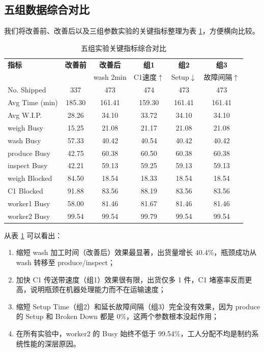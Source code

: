 \documentclass[12pt, a4paper, UTF8]{ctexart}
\begin{document}
\subsection{五组数据综合对比}
我们将改善前、改善后以及三组参数实验的关键指标整理为表 \ref{tab:full_comparison}，方便横向比较。

\begin{table}[H]
    \centering
    \caption{五组实验关键指标综合对比}
    \label{tab:full_comparison}
    \small
    \begin{tabular}{lccccc}
        \toprule
        \textbf{指标} & \textbf{改善前} & \textbf{改善后} & \textbf{组1} & \textbf{组2} & \textbf{组3} \\
        & & wash 2min & C1速度$\uparrow$ & Setup$\downarrow$ & 故障间隔$\uparrow$ \\
        \midrule
        No. Shipped & 337 & 473 & 474 & 473 & 473 \\
        Avg Time (min) & 185.30 & 161.41 & 159.30 & 161.41 & 161.41 \\
        Avg W.I.P. & 28.26 & 34.10 & 33.72 & 34.10 & 34.10 \\
        \midrule
        weigh Busy & 15.25 & 21.08 & 21.17 & 21.08 & 21.08 \\
        wash Busy & 57.33 & 40.42 & 40.54 & 40.42 & 40.42 \\
        produce Busy & 42.75 & 60.38 & 60.50 & 60.38 & 60.38 \\
        inspect Busy & 42.21 & 59.13 & 59.25 & 59.13 & 59.13 \\
        \midrule
        weigh Blocked & 84.50 & 18.54 & 18.33 & 18.54 & 18.54 \\
        C1 Blocked & 91.88 & 83.56 & 88.19 & 83.56 & 83.56 \\
        \midrule
        worker1 Busy & 58.00 & 81.46 & 81.67 & 81.46 & 81.46 \\
        worker2 Busy & 99.54 & 99.54 & 99.79 & 99.54 & 99.54 \\
        \bottomrule
    \end{tabular}
\end{table}

从表 \ref{tab:full_comparison} 可以看出：
\begin{enumerate}
    \item 缩短 wash 加工时间（改善后）效果最显著，出货量增长 40.4\%，瓶颈成功从 wash 转移至 produce/inspect；
    \item 加快 C1 传送带速度（组1）效果很有限，出货仅多 1 件，C1 堵塞率反而更高，说明瓶颈在机器处理能力而不在运输速度；
    \item 缩短 Setup Time（组2）和延长故障间隔（组3）完全没有效果，因为 produce 的 Setup 和 Broken Down 都是 0\%，这两个参数根本没起作用；
    \item 在所有实验中，worker2 的 Busy 始终不低于 99.54\%，工人分配不均是制约系统性能的深层原因。
\end{enumerate}
\end{document}
